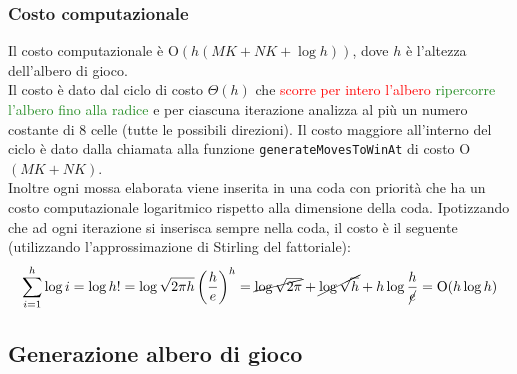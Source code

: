 \documentclass[11pt]{article}
\begin{document}
\subsubsection*{Costo computazionale}
Il costo computazionale è O$(h(MK+NK+\log h))$, dove $h$ è l'altezza dell'albero di gioco.\\
Il costo è dato dal ciclo di costo $\Theta(h)$ che \textcolor{red}{scorre per intero l'albero} \textcolor{ForestGreen}{ripercorre l'albero fino alla radice} e per ciascuna iterazione analizza al più un numero costante di 8 celle (tutte le possibili direzioni). Il costo maggiore all'interno del ciclo è dato dalla chiamata alla funzione \texttt{generateMovesToWinAt} di costo O$(MK+NK)$.\\
Inoltre ogni mossa elaborata viene inserita in una coda con priorità che ha un costo computazionale logaritmico rispetto alla dimensione della coda. Ipotizzando che ad ogni iterazione si inserisca sempre nella coda, il costo è il seguente (utilizzando l'approssimazione di Stirling del fattoriale):
\begin{align*}
\sum_{i=1}^{h} \log i = \log h! = \log \sqrt{2\pi h} \left(\dfrac{h}{e}\right)^h = \cancel{\log \sqrt{2 \pi}} + \cancel{\log \sqrt{h}} + h \log \dfrac{h}{\cancel{e}} = \text{O}(h \log h)
\end{align*}

\subsection*{Generazione albero di gioco}
\end{document}
